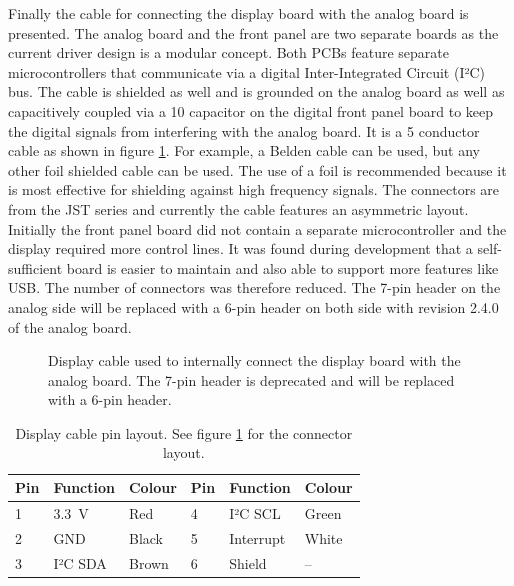 Finally the cable for connecting the display board with the analog board is presented. The analog board and the front panel are two separate boards as the current driver design is a modular concept. Both PCBs feature separate microcontrollers that communicate via a digital Inter-Integrated Circuit (I²C) bus. The cable is shielded as well and is grounded on the analog board as well as capacitively coupled via a \qty{10}{\nF} capacitor on the digital front panel board to keep the digital signals from interfering with the analog board. It is a 5 conductor cable as shown in figure \ref{fig:dgDrive_display_cable}. For example, a Belden  cable can be used, but any other foil shielded cable can be used. The use of a foil is recommended because it is most effective for shielding against high frequency signals. The connectors are from the JST  series and currently the cable features an asymmetric layout. Initially the front panel board did not contain a separate microcontroller and the display required more control lines. It was found during development that a self-sufficient board is easier to maintain and also able to support more features like USB. The number of connectors was therefore reduced. The \num{7}-pin header on the analog side will be replaced with a \num{6}-pin header on both side with revision 2.4.0 of the analog board.
\begin{figure}[ht]
    \centering
    \caption{Display cable used to internally connect the display board with the analog board. The \num{7}-pin header is deprecated and will be replaced with a \num{6}-pin header.}
    \label{fig:dgDrive_display_cable}
\end{figure}
\begin{table}[hb]
    \centering
    \begin{tabular}{llllll}
        \toprule
        Pin& Function& Colour& Pin& Function& Colour\\
        \midrule
        \num{1}& \qty[retain-explicit-plus]{+3.3}{\V}& Red& \num{4}& I²C SCL& Green\\
        \num{2}& GND& Black& \num{5}& Interrupt& White\\
        \num{3}& I²C SDA& Brown& \num{6}& Shield& --\\
        \bottomrule
    \end{tabular}
    \caption{Display cable pin layout. See figure \ref{fig:dgDrive_display_cable} for the connector layout.}
    \label{tab:dgDrive_display_cable_pin_layout}
\end{table}

